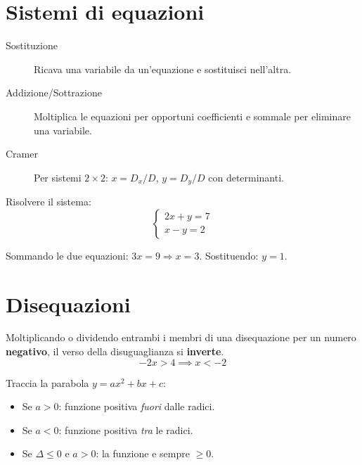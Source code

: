 \documentclass[12pt, a4paper, twoside, openright]{book}
\theoremstyle{definition}
\begin{document}
\section{Sistemi di equazioni}

\begin{defbox}
\begin{description}
  \item[Sostituzione] Ricava una variabile da un'equazione e sostituisci nell'altra.
  \item[Addizione/Sottrazione] Moltiplica le equazioni per opportuni coefficienti e sommale per eliminare una variabile.
  \item[Cramer] Per sistemi $2 \times 2$: $x = D_x/D$, $y = D_y/D$ con determinanti.
\end{description}
\end{defbox}

\begin{esercizio}
Risolvere il sistema:
\[
\begin{cases} 2x + y = 7 \\ x - y = 2 \end{cases}
\]
\end{esercizio}
\begin{soluzione}
Sommando le due equazioni: $3x = 9 \Rightarrow x = 3$. Sostituendo: $y = 1$.
\end{soluzione}

\section{Disequazioni}

\begin{attenzione}
Moltiplicando o dividendo entrambi i membri di una disequazione per un numero
\textbf{negativo}, il verso della disuguaglianza si \textbf{inverte}.
\[
-2x > 4 \implies x < -2
\]
\end{attenzione}

\begin{defbox}
Traccia la parabola $y = ax^2+bx+c$:
\begin{itemize}
  \item Se $a > 0$: funzione positiva \emph{fuori} dalle radici.
  \item Se $a < 0$: funzione positiva \emph{tra} le radici.
  \item Se $\Delta \le 0$ e $a > 0$: la funzione e sempre $\ge 0$.
\end{itemize}
\end{defbox}
\end{document}
